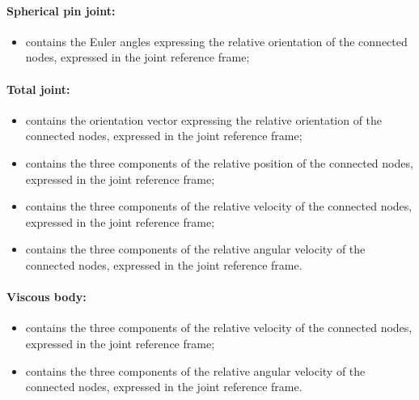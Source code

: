 \paragraph{Spherical pin joint:}
\begin{itemize}
\item {} contains the Euler angles 
  expressing the relative orientation of the connected nodes, expressed in 
  the joint reference frame;
\end{itemize}

\paragraph{Total joint:}
\begin{itemize}
\item {} contains the orientation vector
  expressing the relative orientation of the connected nodes, expressed in 
  the joint reference frame;
\item {} contains the three components of
  the relative position of the connected nodes, expressed in the joint 
  reference frame;
\item {} contains the three components of
  the relative velocity of the connected nodes, expressed in the joint 
  reference frame;
\item {} contains the three components
  of the relative angular velocity of the connected nodes, expressed in 
  the joint reference frame.
\end{itemize}

\paragraph{Viscous body:}
\begin{itemize}
\item {} contains the three components of
  the relative velocity of the connected nodes, expressed in the joint 
  reference frame;
\item {} contains the three components
  of the relative angular velocity of the connected nodes, expressed in 
  the joint reference frame.
\end{itemize}



